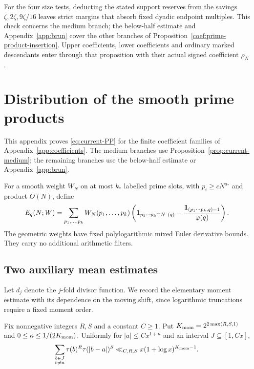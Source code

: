 For the four size tests, deducting the stated support reserves from the
savings $\zeta,2\zeta,9\zeta/16$ leaves strict margins that absorb fixed
dyadic endpoint multiples. This check concerns the medium branch; the
below-half estimate and Appendix~\ref{app:brun} cover the other branches of
Proposition~\ref{coef:prime-product-insertion}. Upper coefficients, lower
coefficients and ordinary marked descendants enter through that proposition
with their actual signed coefficient $\rho_N$.

\section{Distribution of the smooth prime products}
\label{app:prime-products}

This appendix proves \eqref{eq:current-PP} for the finite coefficient families of Appendix~\ref{app:coefficients}. The medium branches use Proposition~\ref{prop:current-medium}; the remaining branches use the below-half estimate or Appendix~\ref{app:brun}.

For a smooth weight $W_N$ on at most $k_*$ labelled prime slots, with
$p_i\ge cN^{a_*}$ and product $O(N)$, define
\[
 E_q(N;W)=\sum_{p_1,\ldots,p_k}W_N(p_1,\ldots,p_k)
 \left(\mathbf 1_{p_1\cdots p_k\equiv N\ (q)}
       -\frac{\mathbf 1_{(p_1\cdots p_k,q)=1}}{\varphi(q)}\right).
\]
The geometric weights have fixed polylogarithmic mixed Euler derivative
bounds.  They carry no additional arithmetic filters.

\subsection{Two auxiliary mean estimates}

Let $d_j$ denote the $j$-fold divisor function.
We record the elementary moment estimate with its dependence on the
moving shift, since logarithmic truncations require a fixed moment order.

\begin{lemma}\label{coef:mixed-moment}
Fix nonnegative integers $R,S$ and a constant $C\ge1$.  Put
$K_{\rm mom}=2^{2\max(R,S,1)}$ and $0\le\kappa\le1/(2K_{\rm mom})$.
Uniformly for $|a|\le Cx^{1+\kappa}$ and an interval
$J\subseteq[1,Cx]$,
\[
 \sum_{\substack{b\in J\\b\ne a}}
       \tau(b)^R\tau(|b-a|)^S
 \ll_{C,R,S} x(1+\log x)^{K_{\rm mom}-1}.
\]
\end{lemma}

